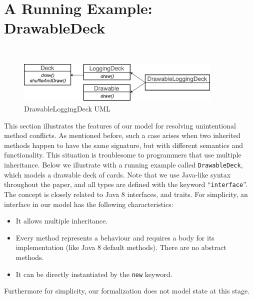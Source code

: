\section{A Running Example: DrawableDeck}~\label{sec:overview}

\begin{figure}[t]
\centering
\includegraphics[height=2cm]{pics/DrawableLoggingDeck.pdf}
\caption{DrawableLoggingDeck UML}\label{fig:subtyping}
\end{figure}

This section illustrates the features of our \MIM{} model for
resolving unintentional method conflicts. As mentioned before, such a
case arises when two inherited methods happen to have the same
signature, but with different semantics and functionality. This
situation is troublesome to programmers that use multiple
inheritance. Below we illustrate with a running example called
\lstinline|DrawableDeck|, which models a drawable deck of cards. 
Note that we use Java-like syntax
throughout the paper, and all types are defined with the keyword
``\lstinline|interface|''. The concept is closely related to Java 8
interfaces, and traits. For simplicity, an interface in our model has
the following characteristics:
\begin{itemize}
	\item It allows multiple inheritance.
	\item Every method represents a behaviour and requires a body for its implementation (like Java 8 default methods). There are no abstract methods.
	\item It can be directly instantiated by the \lstinline|new| keyword.
\end{itemize}
Furthermore for simplicity, our formalization does not model state at
this stage. %

